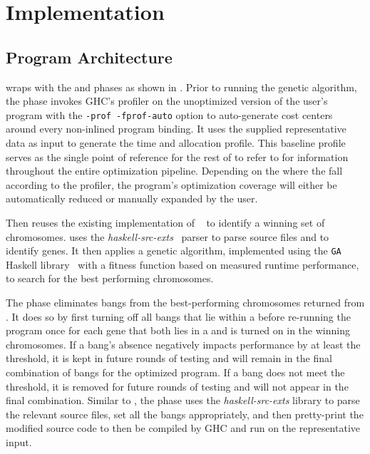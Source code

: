 \chapter{Implementation} 

\label{Chapter4} %


\section{Program Architecture}

\At{} wraps \Ao{} with the  \preopt{} and \postopt{} phases as shown
in .
Prior to running the genetic algorithm, the \preopt{} phase invokes
GHC's profiler on the unoptimized version of the user's program with
the \texttt{-prof -fprof-auto} option to auto-generate cost centers
around every non-inlined program binding.  It uses the supplied
representative data as input to generate the time and
allocation profile.  This baseline profile serves as the single point of
reference for the rest of \At{} to refer to for \hotspot{}
information throughout the entire optimization pipeline.
Depending on the where the \hotspots{} fall according to the profiler,
the program's optimization coverage will either be
automatically reduced or manually expanded by the user.

Then \At{} reuses the existing implementation
of \Ao{}~\cite{autobahn-wang} to identify a winning set of
chromosomes.
\Ao{} uses the \textit{haskell-src-exts}~\cite{langexts} parser to parse
source files and to identify genes.
It then applies a genetic algorithm,
implemented using the \texttt{GA} Haskell library~\cite{genetic}
with a fitness function based on measured runtime performance, 
to search for the best performing chromosomes.

The \postopt{} phase eliminates bangs from the best-performing
chromosomes returned from \Ao{}.  It does so by first turning off all
bangs that lie within a \coldspot{} before re-running the program
once for each gene that both lies in a \hotspot{} and is turned on in
the winning chromosomes. If a bang's absence negatively impacts performance
by at least the \absim{} threshold, it is kept in future rounds of testing and
will remain in the final combination of bangs for the optimized
program. If a bang does not meet the \absim{} threshold, it is removed
for future rounds of testing and will not appear in the final
combination. Similar to \Ao{}, the \postopt{} phase uses
the \textit{haskell-src-exts} library to parse the relevant source
files, set all the bangs appropriately, and then pretty-print the
modified source code to then be compiled by GHC and run on the
representative input.

